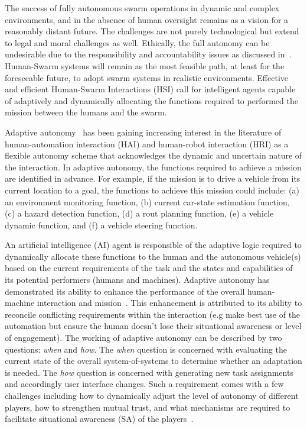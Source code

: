 \documentclass[journal]{IEEEtran}
\begin{document}
The success of fully autonomous swarm operations in dynamic and complex environments, and in the absence of human oversight remains as a vision for a reasonably distant future.  
The challenges are not purely technological but extend to legal and moral challenges as well. 
Ethically, the full autonomy can be undesirable due to the responsibility and accountability issues as discussed in~\cite{should}. 
Human-Swarm systems will remain as the most feasible path, at least for the foreseeable future, to adopt swarm systems in realistic environments. 
Effective and efficient Human-Swarm Interactions (HSI) call for intelligent agents capable of adaptively and dynamically allocating the functions required to performed the mission between the humans and the swarm. 

Adaptive autonomy~\cite{aiding,AdaptiveHA,triggers} has been gaining increasing interest in the literature of human-automation interaction (HAI) and human-robot interaction (HRI) as a flexible autonomy scheme that acknowledges the dynamic and uncertain nature of the interaction. 
In adaptive autonomy, the functions required to achieve a mission are identified in advance. 
For example, if the mission is to drive a vehicle from its current location to a goal, the functions to achieve this mission could include: (a) an environment monitoring function, (b) current car-state estimation function, (c) a hazard detection function, (d) a rout planning function, (e) a vehicle dynamic function, and (f) a vehicle steering function.

An artificial intelligence (AI) agent is responsible of the adaptive logic required to dynamically allocate these functions to the human and the autonomous vehicle(s) based on the current requirements of the task and the states and capabilities of its potential performers (humans and machines). 
Adaptive autonomy has demonstrated its ability to enhance the performance of the overall human-machine interaction and mission~\cite{teaming}. 
This enhancement is attributed to its ability to reconcile conflicting requirements within the interaction (e.g make best use of the automation but ensure the human doesn\textquoteright t lose their situational awareness or level of engagement). 
The working of adaptive autonomy can be described by two questions: \textit{when} and \textit{how}. 
The \emph{when} question is concerned with evaluating the current state of the overall system-of-systems to determine whether an adaptation is needed. 
The \emph{how} question is concerned with generating new task assignments and accordingly user interface changes. 
Such a requirement comes with a few challenges including how to dynamically adjust the level of autonomy of different players, how to strengthen mutual trust, and what mechanisms are required to facilitate situational awareness (SA) of the players~\cite{chen2014human}.
\end{document}
